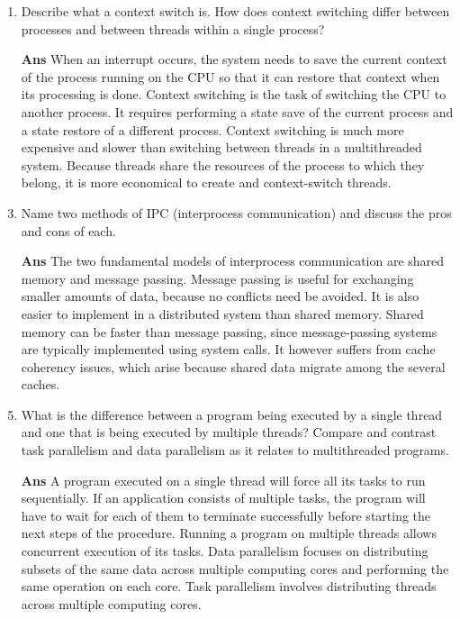 \documentclass[paper=usletter, fontsize=12pt]{extarticle}
\begin{document}
\begin{enumerate}[label=\textbf{\arabic*}]
        \item Describe what a context switch is. How does context switching
        differ between processes and between threads within a single process?
        \item[\textbf{Ans}]
        When an interrupt occurs, the system needs to save the current context
        of the process running on the CPU so that it can restore that context
        when its processing is done. Context switching is the task of switching
        the CPU to another process. It requires performing a state save of the
        current process and a state restore of a different process. Context
        switching is much more expensive and slower than switching between
        threads in a multithreaded system. Because threads share the resources
        of the process to which they belong, it is more economical to create
        and context-switch threads.
        \vspace{0.2in}

        \item Name two methods of IPC (interprocess communication) and discuss
        the pros and cons of each.
        \item[\textbf{Ans}]
        The two fundamental models of interprocess communication are shared
        memory and message passing. Message passing is useful for exchanging
        smaller amounts of data, because no conflicts need be avoided. It is
        also easier to implement in a distributed system than shared memory.
        Shared memory can be faster than message passing, since message-passing
        systems are typically implemented using system calls. It however
        suffers from cache coherency issues, which arise because shared data
        migrate among the several caches.
        \vspace{0.2in}

        \item What is the difference between a program being executed by a
        single thread and one that is being executed by multiple threads?
        Compare and contrast task parallelism and data parallelism as it
        relates to multithreaded programs.
        \item[\textbf{Ans}]
        A program executed on a single thread will force all its tasks to run
        sequentially. If an application consists of multiple tasks, the program
        will have to wait for each of them to terminate successfully before
        starting the next steps of the procedure. Running a program on multiple
        threads allows concurrent execution of its tasks. Data parallelism
        focuses on distributing subsets of the same data across multiple
        computing cores and performing the same operation on each core. Task
        parallelism involves distributing threads across multiple computing
        cores.
        \vspace{0.2in}

    \end{enumerate}
\end{document}
